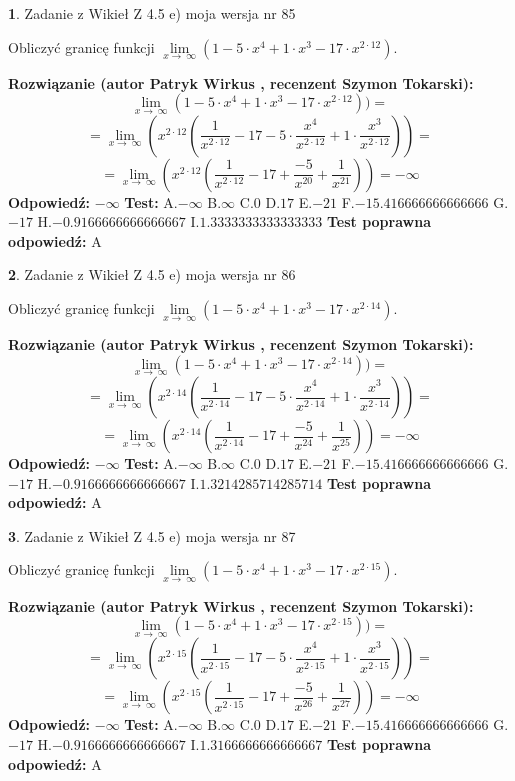 \documentclass[12pt, a4paper]{article}
\theoremstyle{definition} %
\newtheorem{zad}{}
\newcommand{\zadStart}[1]{\begin{zad}#1\newline}
\newcommand{\zadStop}{\end{zad}}
\newcommand{\rozwStart}[2]{\noindent \textbf{Rozwiązanie (autor #1 , recenzent #2): }\newline}
\newcommand{\rozwStop}{\newline}
\newcommand{\odpStart}{\noindent \textbf{Odpowiedź:}\newline}
\newcommand{\odpStop}{\newline}
\newcommand{\testStart}{\noindent \textbf{Test:}\newline}
\newcommand{\testStop}{\newline}
\newcommand{\kluczStart}{\noindent \textbf{Test poprawna odpowiedź:}\newline}
\newcommand{\kluczStop}{\newline}
\begin{document}
\zadStart{Zadanie z Wikieł Z 4.5 e) moja wersja nr 85}


Obliczyć granicę funkcji  $\lim\limits_{x\to\ \infty}(1 - 5 \cdot x^{4}+1 \cdot x^{3}- 17 \cdot x^{2\cdot12})$.
\zadStop
\rozwStart{Patryk Wirkus}{Szymon Tokarski}
$$\lim\limits_{x\to\ \infty}(1 - 5 \cdot x^{4}+1 \cdot x^{3}- 17 \cdot x^{2\cdot12}))=$$
$$=\lim\limits_{x\to\ \infty}(x^{2\cdot12}(\frac{1}{x^{2\cdot12}}-17 -5 \cdot \frac{x^{4}}{x^{2\cdot12}}+1 \cdot \frac{x^{3}}{x^{2\cdot12}}))=$$
$$=\lim\limits_{x\to\ \infty}(x^{2\cdot12}(\frac{1}{x^{2\cdot12}}-17 + \frac{-5}{x^{20}}+ \frac{1}{x^{21}}))=-\infty$$
\rozwStop
\odpStart
$-\infty$
\odpStop
\testStart
A.$-\infty$ B.$\infty$ C.$0$ D.$17$ E.$-21$
F.$-15.416666666666666$ G.$-17$
H.$-0.9166666666666667$
I.$1.3333333333333333$
\testStop
\kluczStart
A
\kluczStop



\zadStart{Zadanie z Wikieł Z 4.5 e) moja wersja nr 86}


Obliczyć granicę funkcji  $\lim\limits_{x\to\ \infty}(1 - 5 \cdot x^{4}+1 \cdot x^{3}- 17 \cdot x^{2\cdot14})$.
\zadStop
\rozwStart{Patryk Wirkus}{Szymon Tokarski}
$$\lim\limits_{x\to\ \infty}(1 - 5 \cdot x^{4}+1 \cdot x^{3}- 17 \cdot x^{2\cdot14}))=$$
$$=\lim\limits_{x\to\ \infty}(x^{2\cdot14}(\frac{1}{x^{2\cdot14}}-17 -5 \cdot \frac{x^{4}}{x^{2\cdot14}}+1 \cdot \frac{x^{3}}{x^{2\cdot14}}))=$$
$$=\lim\limits_{x\to\ \infty}(x^{2\cdot14}(\frac{1}{x^{2\cdot14}}-17 + \frac{-5}{x^{24}}+ \frac{1}{x^{25}}))=-\infty$$
\rozwStop
\odpStart
$-\infty$
\odpStop
\testStart
A.$-\infty$ B.$\infty$ C.$0$ D.$17$ E.$-21$
F.$-15.416666666666666$ G.$-17$
H.$-0.9166666666666667$
I.$1.3214285714285714$
\testStop
\kluczStart
A
\kluczStop



\zadStart{Zadanie z Wikieł Z 4.5 e) moja wersja nr 87}


Obliczyć granicę funkcji  $\lim\limits_{x\to\ \infty}(1 - 5 \cdot x^{4}+1 \cdot x^{3}- 17 \cdot x^{2\cdot15})$.
\zadStop
\rozwStart{Patryk Wirkus}{Szymon Tokarski}
$$\lim\limits_{x\to\ \infty}(1 - 5 \cdot x^{4}+1 \cdot x^{3}- 17 \cdot x^{2\cdot15}))=$$
$$=\lim\limits_{x\to\ \infty}(x^{2\cdot15}(\frac{1}{x^{2\cdot15}}-17 -5 \cdot \frac{x^{4}}{x^{2\cdot15}}+1 \cdot \frac{x^{3}}{x^{2\cdot15}}))=$$
$$=\lim\limits_{x\to\ \infty}(x^{2\cdot15}(\frac{1}{x^{2\cdot15}}-17 + \frac{-5}{x^{26}}+ \frac{1}{x^{27}}))=-\infty$$
\rozwStop
\odpStart
$-\infty$
\odpStop
\testStart
A.$-\infty$ B.$\infty$ C.$0$ D.$17$ E.$-21$
F.$-15.416666666666666$ G.$-17$
H.$-0.9166666666666667$
I.$1.3166666666666667$
\testStop
\kluczStart
A
\kluczStop
\end{document}
